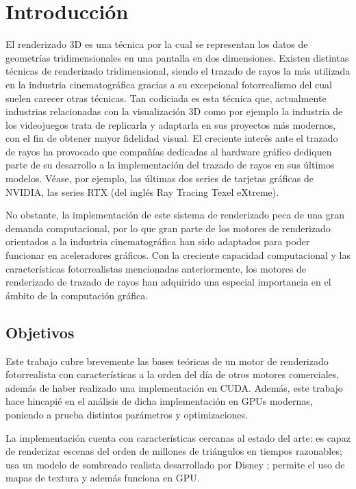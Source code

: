 \chapter{Introducción}
	
El renderizado 3D es una técnica por la cual se representan los datos de geometrías tridimensionales en una pantalla en dos dimensiones. Existen distintas técnicas de renderizado tridimensional, siendo el trazado de rayos la más utilizada en la industria cinematográfica gracias a su excepcional fotorrealismo del cual suelen carecer otras técnicas. Tan codiciada es esta técnica que, actualmente industrias relacionadas con la visualización 3D como por ejemplo la industria de los videojuegos trata de replicarla y adaptarla en sus proyectos más modernos, con el fin de obtener mayor fidelidad visual.
El creciente interés ante el trazado de rayos ha provocado que compañías dedicadas al hardware gráfico dediquen parte de su desarrollo a la implementación del trazado de rayos en sus últimos modelos. Véase, por ejemplo, las últimas dos series de tarjetas gráficas de NVIDIA, las series RTX (del inglés Ray Tracing Texel eXtreme).

No obstante, la implementación de este sistema de renderizado peca de una gran demanda computacional, por lo que gran parte de los motores de renderizado orientados a la industria cinematográfica han sido adaptados para poder funcionar en aceleradores gráficos. Con la creciente capacidad computacional y las características fotorrealistas mencionadas anteriormente, los motores de renderizado de trazado de rayos han adquirido una especial importancia en el ámbito de la computación gráfica.



\section{Objetivos}

Este trabajo cubre brevemente las bases teóricas de un motor de renderizado fotorrealista con características a la orden del día de otros motores comerciales, además de haber realizado una implementación en CUDA. Además, este trabajo hace hincapié en el análisis de dicha implementación en GPUs modernas, poniendo a prueba distintos parámetros y optimizaciones.

La implementación cuenta con características cercanas al estado del arte: es capaz de renderizar escenas del orden de millones de triángulos en tiempos razonables; usa un modelo de sombreado realista desarrollado por Disney \cite{burley2012physically}; permite el uso de mapas de textura y además funciona en GPU.


